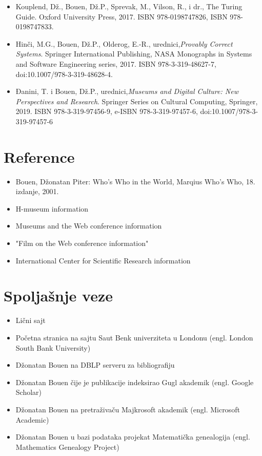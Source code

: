 \documentclass[a4paper]{article}
\begin{document}
\begin{itemize}
\item Kouplend, Dž., Bouen, Dž.P., Sprevak, M., Vilson, R., i dr., The Turing Guide. Oxford University Press, 2017. ISBN 978-0198747826, ISBN 978-0198747833.
\item Hinči, M.G., Bouen, Dž.P., Olderog, E.-R., urednici,{\itshape Provably Correct Systems}. Springer International Publishing, NASA Monographs in Systems and Software Engineering series, 2017. ISBN 978-3-319-48627-7, doi:10.1007/978-3-319-48628-4.
\item Đanini, T. i Bouen, Dž.P., urednici,{\itshape Museums and Digital Culture: New Perspectives and Research}. Springer Series on Cultural Computing, Springer, 2019. ISBN 978-3-319-97456-9, e-ISBN 978-3-319-97457-6, doi:10.1007/978-3-319-97457-6
\end{itemize}

\section{Reference}

\begin{itemize}

\item Bouen, Džonatan Piter: Who's Who in the World, Marqius Who's Who, 18. izdanje, 2001.
\item H-museum information
\item Museums and the Web conference information
\item "Film on the Web conference information"
\item International Center for Scientific Research information
\end{itemize}

\section{Spoljašnje veze}

\begin{itemize}

\item Lični sajt
\item Početna stranica na sajtu Saut Benk univerziteta u Londonu (engl. London South Bank University)
\item Džonatan Bouen na DBLP serveru za bibliografiju
\item Džonatan Bouen čije je publikacije indeksirao Gugl akademik (engl. Google Scholar)
\item Džonatan Bouen na pretraživaču Majkrosoft akademik (engl. Microsoft Academic)
\item Džonatan Bouen u bazi podataka projekat Matematička genealogija (engl. Mathematics Genealogy Project)
\end{itemize}
\end{document}
